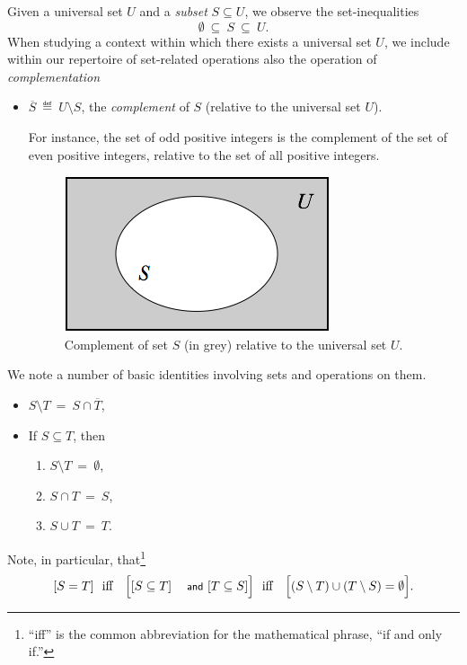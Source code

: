 \noindent
Given a universal set $U$ and a {\em subset} $S \subseteq U$,
we observe the set-inequalities
\[ \emptyset \ \subseteq \ S \ \subseteq \ U. \]
When studying a context within which there exists a universal set $U$,
we include within our repertoire of set-related operations also the
operation of {\it complementation}
\begin{itemize}
\item
$\overline{S} \ \eqdef \ U \setminus S$,
the {\em complement} of $S$ (relative to the universal set $U$).

For instance, the set of odd positive integers is the complement of
the set of even positive integers, relative to the set of all positive
integers.
\begin{figure}[htb]
\begin{center}
        \includegraphics[scale=0.4]{FiguresMaths/setComplement}
        \caption{Complement of set $S$ (in grey) relative to the universal set $U$.}
        \label{fig:setComplement}
\end{center}
\end{figure}
\end{itemize}
We note a number of basic identities involving sets and operations on
them.
\begin{itemize}
\item
$S \setminus T \ = \ S \cap \overline{T}$,
\item
If $S \subseteq T$, then
  \begin{enumerate}
  \item
$S \setminus T \ = \ \emptyset$,
  \item
$S \cap T \ = \ S$,
  \item
$S \cup T \ = \ T$.
  \end{enumerate}
\end{itemize}
Note, in particular, that\footnote{``iff'' is the common abbreviation
  for the mathematical phrase, ``if and only if.''}
\[ [S = T] \ \mbox{  iff  } \ \ \Bigl[[S \subseteq T] \mbox{
    {\small\sf and} } [T \subseteq S]\Bigr] \ \mbox{  iff  }
\ \ \Bigl[ (S \setminus T) \cup (T \setminus S) = \emptyset\Bigr].
\]

